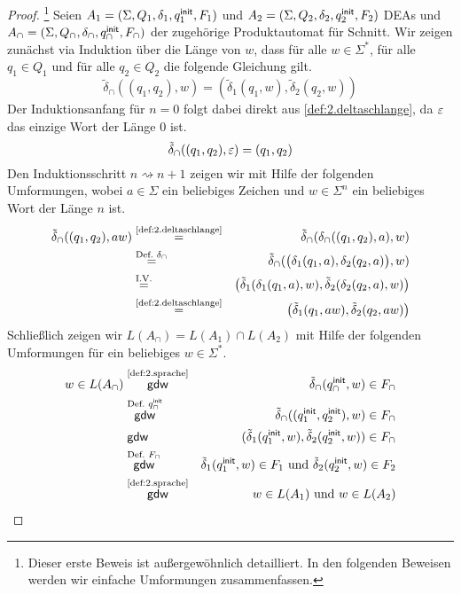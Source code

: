 

\begin{proof}\footnote{Dieser erste Beweis ist außergewöhnlich detailliert. In den folgenden Beweisen werden wir einfache Umformungen zusammenfassen.}
Seien $A_1=(\Sigma, Q_1,\delta_1,q^\mathsf{init}_1,F_1)$ und $A_2=(\Sigma, Q_2,\delta_2,q^\mathsf{init}_2,F_2)$ \ac{DEA}s und
$A_\cap=(\Sigma, Q_\cap,\delta_\cap,q^\mathsf{init}_\cap,F_\cap)$ der zugehörige Produktautomat für Schnitt.
Wir zeigen zunächst via Induktion über die Länge von $w$, dass für alle $w\in\Sigma^*$, für alle $q_1\in Q_1$ und für alle $q_2\in Q_2$ die folgende Gleichung gilt.
$$\tilde{\delta}_\cap((q_1,q_2),w) = (\tilde{\delta}_1(q_1,w), \tilde{\delta}_2(q_2,w))$$
Der Induktionsanfang für $n=0$ folgt dabei direkt aus \autoref{def:2.deltaschlange}, da $\varepsilon$ das einzige Wort der Länge $0$ ist.
$$\tilde{\delta}_\cap((q_1,q_2),\varepsilon) = (q_1,q_2)$$
Den Induktionsschritt $n\rightsquigarrow n+1$ zeigen wir mit Hilfe der folgenden Umformungen, wobei $a\in\Sigma$ ein beliebiges Zeichen und $w\in\Sigma^n$ ein beliebiges Wort der Länge $n$ ist.
\begin{eqnarray*}
  \tilde{\delta}_\cap((q_1,q_2),aw) 
    & \stackrel{\text{\autoref{def:2.deltaschlange}}}{=} & \tilde{\delta}_\cap(\delta_\cap((q_1,q_2),a),w)\\
    & \stackrel{\text{Def.\ }\delta_\cap}{=} & \tilde{\delta}_\cap (\big(\delta_1(q_1,a),\delta_2(q_2,a)\big),w)\\
    & \stackrel{\text{I.V.}}{=} & \big(\tilde{\delta}_1 (\delta_1(q_1,a),w), \tilde{\delta}_2(\delta_2(q_2,a),w)\big)\\
    & \stackrel{\text{\autoref{def:2.deltaschlange}}}{=} & \big(\tilde{\delta}_1(q_1,aw), \tilde{\delta}_2(q_2,aw)\big)
\end{eqnarray*}
Schließlich zeigen wir $L(A_\cap)=L(A_1)\cap L(A_2)$ mit Hilfe der folgenden Umformungen für ein beliebiges $w\in\Sigma^*$.
\begin{eqnarray*}
  w\in L(A_\cap)
  & \stackrel{\text{\autoref{def:2.sprache}}}{\mathsf{gdw}} & \tilde{\delta}_\cap(\qinit_\cap,w)\in F_\cap\\
  & \stackrel{\text{Def.\ }\qinit_\cap}{\mathsf{gdw}} & \tilde{\delta}_\cap((\qinit_1,\qinit_2),w)\in F_\cap\\
  & \stackrel{}{\mathsf{gdw}} & (\tilde{\delta}_1(\qinit_1,w),\tilde{\delta}_2(\qinit_2,w))\in F_\cap\\
  & \stackrel{\text{Def.\ }F_\cap}{\mathsf{gdw}} & \tilde{\delta}_1(\qinit_1,w)\in F_1 \text{ und } \tilde{\delta}_2(\qinit_2,w)\in F_2\\
  & \stackrel{\text{\autoref{def:2.sprache}}}{\mathsf{gdw}} & w\in L(A_1) \text{ und } w\in L(A_2)
\end{eqnarray*}
\end{proof}




